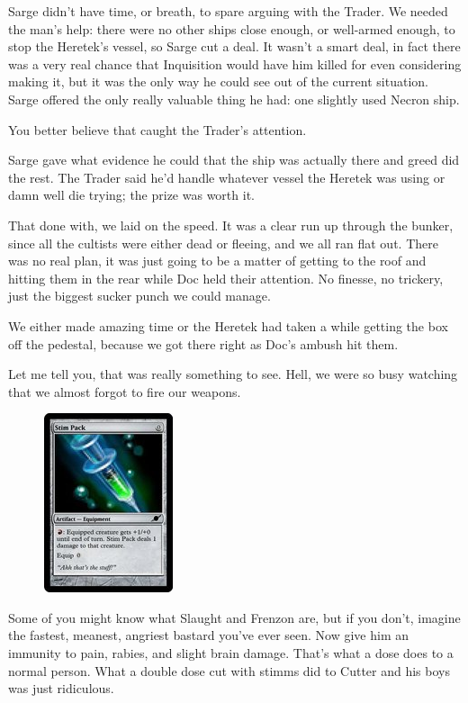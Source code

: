 Sarge didn’t have time, or breath, to spare arguing with the Trader. 
We needed the man’s help: 
there were no other ships close enough, or well-armed enough, to stop the Heretek’s vessel, so Sarge cut a deal. 
It wasn’t a smart deal, in fact there was a very real chance that Inquisition would have him killed for even considering making it, but it was the only way he could see out of the current situation. 
Sarge offered the only really valuable thing he had: 
one slightly used Necron ship.

You better believe that caught the Trader’s attention.

Sarge gave what evidence he could that the ship was actually there and greed did the rest. 
The Trader said he’d handle whatever vessel the Heretek was using or damn well die trying; 
the prize was worth it.

That done with, we laid on the speed. 
It was a clear run up through the bunker, since all the cultists were either dead or fleeing, and we all ran flat out. 
There was no real plan, it was just going to be a matter of getting to the roof and hitting them in the rear while Doc held their attention. 
No finesse, no trickery, just the biggest sucker punch we could manage.

We either made amazing time or the Heretek had taken a while getting the box off the pedestal, because we got there right as Doc’s ambush hit them.

Let me tell you, that was really something to see. 
Hell, we were so busy watching that we almost forgot to fire our weapons.

\begin{figure}
	\begin{center}
		\includegraphics[width=\figwidth]{pics/8/56.png}
	\end{center}
\end{figure}
Some of you might know what Slaught and Frenzon are, but if you don’t, imagine the fastest, meanest, angriest bastard you’ve ever seen. 
Now give him an immunity to pain, rabies, and slight brain damage. 
That’s what a dose does to a normal person. 
What a double dose cut with stimms did to Cutter and his boys was just ridiculous.

